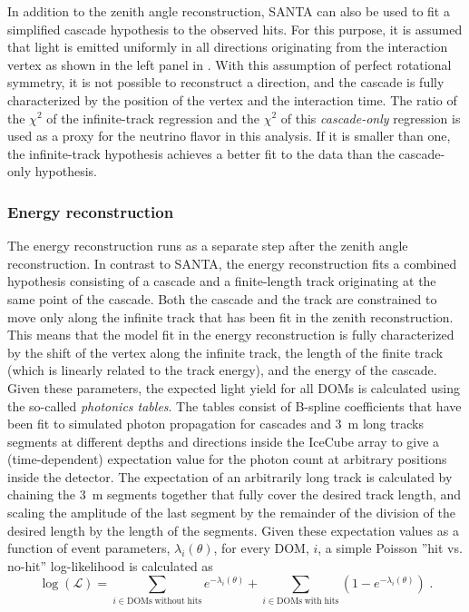 In addition to the zenith angle reconstruction, SANTA can also be used to fit a simplified cascade hypothesis to the observed hits. For this purpose, it is assumed that light is emitted uniformly in all directions originating from the interaction vertex as shown in the left panel in . With this assumption of perfect rotational symmetry, it is not possible to reconstruct a direction, and the cascade is fully characterized by the position of the vertex and the interaction time. The ratio of the $\chi^2$ of the infinite-track regression and the $\chi^2$ of this \emph{cascade-only} regression is used as a proxy for the neutrino flavor in this analysis. If it is smaller than one, the infinite-track hypothesis achieves a better fit to the data than the cascade-only hypothesis.

\subsubsection{Energy reconstruction}
\label{sec:leera}
The energy reconstruction runs as a separate step after the zenith angle reconstruction. In contrast to \textsc{SANTA}, the energy reconstruction fits a combined hypothesis consisting of a cascade and a finite-length track originating at the same point of the cascade. Both the cascade and the track are constrained to move only along the infinite track that has been fit in the zenith reconstruction. This means that the model fit in the energy reconstruction is fully characterized by the shift of the vertex along the infinite track, the length of the finite track (which is linearly related to the track energy), and the energy of the cascade. Given these parameters, the expected light yield for all DOMs is calculated using the so-called \emph{photonics tables}. The tables consist of B-spline coefficients that have been fit to simulated photon propagation for cascades and 3~m long tracks segments at different depths and directions inside the IceCube array to give a (time-dependent) expectation value for the photon count at arbitrary positions inside the detector. The expectation of an arbitrarily long track is calculated by chaining the 3~m segments together that fully cover the desired track length, and scaling the amplitude of the last segment by the remainder of the division of the desired length by the length of the segments. Given these expectation values as a function of event parameters, $\lambda_i(\theta)$, for every DOM, $i$, a simple Poisson ''hit vs. no-hit'' log-likelihood is calculated as
\begin{equation}
    \log(\mathcal{L}) = \sum_{i\in\mathrm{DOMs\;without\;hits}} e^{-\lambda_i(\theta)} + \sum_{i\in\mathrm{DOMs\;with\;hits}} (1 - e^{-\lambda_i(\theta)})\;.
    \label{eq:leera-llh}
\end{equation}
